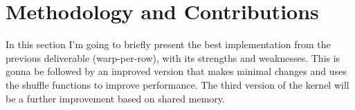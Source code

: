 \documentclass[conference]{IEEEtran}
\begin{document}

\section{Methodology and Contributions}\label{sec:methodology}

% 
% 
% 

In this section I'm going to briefly present the best implementation from the previous deliverable (warp-per-row), with its strengths and weaknesses. This is gonna be followed by an improved version that makes minimal changes and uses the shuffle functions to improve performance. The third version of the kernel will be a further improvement based on shared memory.
\end{document}
